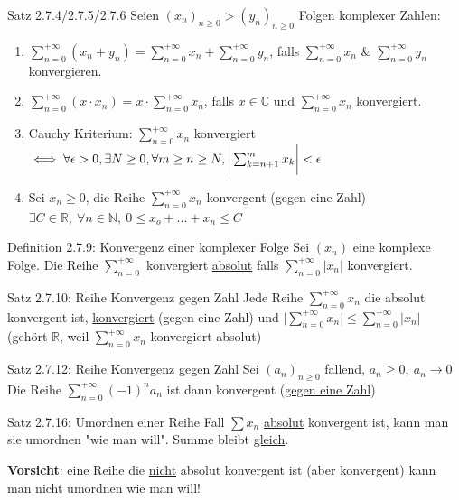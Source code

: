 \documentclass[a4paper,10pt]{article}
\begin{document}
\begin{tbox}
    {Satz 2.7.4/2.7.5/2.7.6}
    Seien $(x_n)_{n\ge 0} >(y_n)_{n\ge0}$ Folgen komplexer Zahlen:
    \begin{enumerate}
        \item $\sum_{n=0}^{+\infty} (x_n+y_n)=\sum_{n=0}^{+\infty} x_n+\sum_{n=0}^{+\infty} y_n$, falls $\sum_{n=0}^{+\infty} x_n$ \& $\sum_{n=0}^{+\infty} y_n$ konvergieren.
        \item $\sum_{n=0}^{+\infty} (x\cdot x_n) = x \cdot\sum_{n=0}^{+\infty} x_n$, falls $x\in \mathbb C$ und $\sum_{n=0}^{+\infty}x_n$ konvergiert.
        \item Cauchy Kriterium: $\sum_{n=0}^{+\infty} x_n$ konvergiert $\iff \forall \epsilon >0, \exists N\ge0, \forall m\ge n\ge N, 
        \\\bigg|\sum_{k=n+1}^{m} x_k \bigg|<\epsilon$
        \item Sei $x_n\ge 0$, die Reihe $\sum_{n=0}^{+\infty}x_n$ konvergent (gegen eine Zahl) $\exists C \in \mathbb R, \ \forall n \in \mathbb N,\ 0\le x_o+...+x_n\le C$
    \end{enumerate}
\end{tbox}
\begin{defbox}
    {Definition 2.7.9: Konvergenz einer komplexer Folge}
    Sei $(x_n)$ eine komplexe Folge. Die Reihe $\sum_{n=0}^{+\infty}$ konvergiert \underline{absolut} falls $\sum_{n=0}^{+\infty}|x_n|$ konvergiert.
\end{defbox}
\begin{tbox}
    {Satz 2.7.10: Reihe Konvergenz gegen Zahl}  
    Jede Reihe $\sum_{n=0}^{+\infty}x_n$ die absolut konvergent ist, \underline{konvergiert} (gegen eine Zahl) und $\big|\sum_{n=0}^{+\infty}x_n\big|\le\sum_{n=0}^{+\infty}|x_n|$ (gehört $\mathbb R$, weil $\sum_{n=0}^{+\infty}x_n$ konvergiert absolut)
\end{tbox} 
\begin{tbox}
    {Satz 2.7.12: Reihe Konvergenz gegen Zahl}
    Sei $(a_n)_{n\ge0}$ fallend, $ a_n\ge 0, \ a_n\longrightarrow 0$ Die Reihe $\sum_{n=0}^{+\infty}(-1)^na_n$ ist dann konvergent (\underline{gegen eine Zahl})
\end{tbox}
\begin{tbox}
    {Satz 2.7.16: Umordnen einer Reihe}
    Fall $\sum x_n$ \underline{absolut} konvergent ist, kann man sie umordnen "wie man will". Summe bleibt \underline{gleich}.
\end{tbox}
\begin{flushleft}
    \textbf{Vorsicht}: eine Reihe die \underline{nicht} absolut konvergent ist (aber konvergent) kann man nicht umordnen wie man will!
\end{flushleft}
\end{document}
